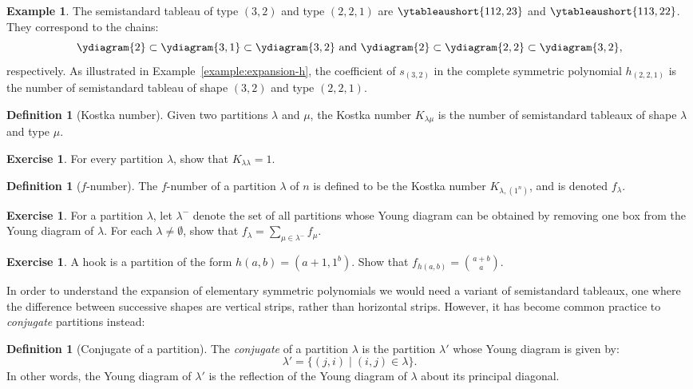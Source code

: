 \documentclass[11pt]{amsproc}
\theoremstyle{definition}
\newtheorem{definition}[theorem]{Definition}
\theoremstyle{example}
\newtheorem{example}[theorem]{Example}
\newtheorem{exercise}[theorem]{Exercise}
\begin{document}
\begin{example}
  The semistandard tableau of type $(3,2)$ and type $(2,2,1)$ are $\ytableaushort{112,23}$ and $\ytableaushort{113,22}$.
  They correspond to the chains:
  \begin{displaymath}
    \ydiagram{2}\subset \ydiagram{3,1}\subset \ydiagram{3,2} \text{ and } \ydiagram{2}\subset \ydiagram{2,2}\subset \ydiagram{3,2},
  \end{displaymath}
  respectively.
  As illustrated in Example~\ref{example:expansion-h}, the coefficient of $s_{(3,2)}$ in the complete symmetric polynomial $h_{(2,2,1)}$ is the number of semistandard tableau of shape $(3,2)$ and type $(2,2,1)$.
\end{example}
\begin{definition}
  [Kostka number]
  Given two partitions $\lambda$ and $\mu$, the Kostka number $K_{\lambda\mu}$ is the number of semistandard tableaux of shape $\lambda$ and type $\mu$.
\end{definition}
\begin{exercise}
  \label{exercise:unit-kostka}
  For every partition $\lambda$, show that $K_{\lambda\lambda}=1$.
\end{exercise}
\begin{definition}
  [$f$-number]
  The $f$-number of a partition $\lambda$ of $n$ is defined to be the Kostka number $K_{\lambda,(1^n)}$, and is denoted $f_\lambda$.
\end{definition}
\begin{exercise}
  For a partition $\lambda$, let $\lambda^-$ denote the set of all partitions whose Young diagram can be obtained by removing one box from the Young diagram of $\lambda$.
  For each $\lambda\neq \emptyset$, show that $f_\lambda = \sum_{\mu\in \lambda^-} f_\mu$.
\end{exercise}
\begin{exercise}
  A hook is a partition of the form $h(a,b)=(a+1,1^b)$.
  Show that $f_{h(a,b)}=\binom{a+b}a$.
\end{exercise}
In order to understand the expansion of elementary symmetric polynomials we would need a variant of semistandard tableaux, one where the difference between successive shapes are vertical strips, rather than horizontal strips.
However, it has become common practice to \emph{conjugate} partitions instead:
\begin{definition}
  [Conjugate of a partition]
  The \emph{conjugate} of a partition $\lambda$ is the partition $\lambda'$ whose Young diagram is given by:
  \begin{displaymath}
    \lambda' = \{(j,i)\mid (i, j)\in \lambda\}.
  \end{displaymath}
  In other words, the Young diagram of $\lambda'$ is the reflection of the Young diagram of $\lambda$ about its principal diagonal.
\end{definition}
\end{document}
